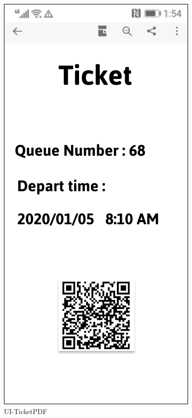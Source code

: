\documentclass[a4paper,12pt]{report}
\begin{document}
\begin{figure}[H]
\begin{minipage}[t]{0.56\linewidth}
		\includegraphics[scale=0.5]{UI-TicketPDF.png}
		\caption{UI-TicketPDF}
		\label{fig:UI-TicketPDF}
	\end{minipage}
\end{figure}
\end{document}
